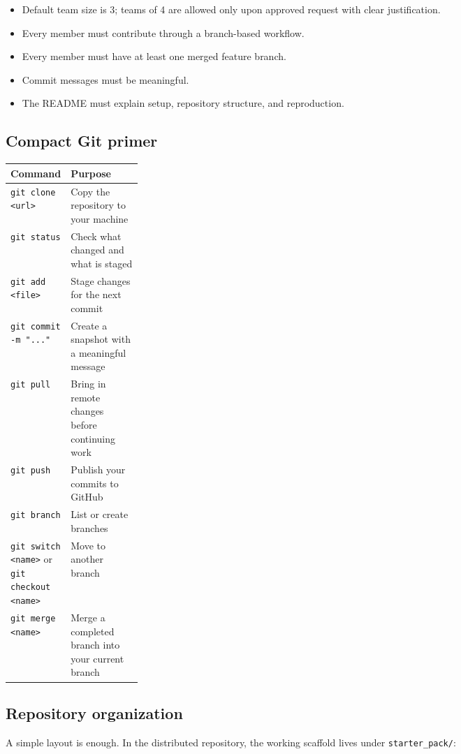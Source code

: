 \documentclass[11pt]{article}
\begin{document}
\begin{itemize}
    \item Default team size is 3; teams of 4 are allowed only upon approved request with clear justification.
    \item Every member must contribute through a branch-based workflow.
    \item Every member must have at least one merged feature branch.
    \item Commit messages must be meaningful.
    \item The README must explain setup, repository structure, and reproduction.
\end{itemize}

\subsection{Compact Git primer}

\begin{tabularx}{\linewidth}{>{\ttfamily\raggedright\arraybackslash}p{0.22\linewidth} >{\raggedright\arraybackslash}X}
\toprule
\textbf{Command} & \textbf{Purpose} \\
\midrule
\verb|git clone <url>| & Copy the repository to your machine \\
\verb|git status| & Check what changed and what is staged \\
\verb|git add <file>| & Stage changes for the next commit \\
\verb|git commit -m "..."| & Create a snapshot with a meaningful message \\
\verb|git pull| & Bring in remote changes before continuing work \\
\verb|git push| & Publish your commits to GitHub \\
\verb|git branch| & List or create branches \\
\verb|git switch <name>| or \verb|git checkout <name>| & Move to another branch \\
\verb|git merge <name>| & Merge a completed branch into your current branch \\
\bottomrule
\end{tabularx}

\subsection{Repository organization}

A simple layout is enough. In the distributed repository, the working scaffold lives under \verb|starter_pack/|:
\end{document}
